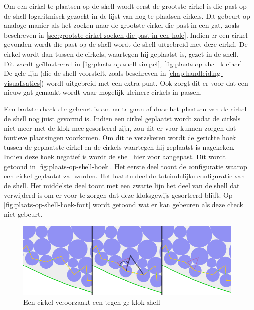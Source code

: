 \documentclass[12pt,a4paper,oneside]{book}
\begin{document}
Om een cirkel te plaatsen op de shell wordt eerst de grootste cirkel is die past op de shell logaritmisch gezocht in de lijst van nog-te-plaatsen cirkels.
Dit gebeurt op analoge manier als het zoeken naar de grootste cirkel die past in een gat, zoals beschreven in \autoref{sec:grootste-cirkel-zoeken-die-past-in-een-hole}.
Indien er een cirkel gevonden wordt die past op de shell wordt de shell uitgebreid met deze cirkel.
De cirkel wordt dan tussen de cirkels, waartegen hij geplaatst is, gezet in de shell.
Dit wordt geïllustreerd in \autoref{fig:plaats-op-shell-simpel}, \autoref{fig:plaats-op-shell-kleiner}.
De gele lijn (die de shell voorstelt, zoals beschreven in \autoref{chap:handleiding-visualisaties}) wordt uitgebreid met een extra punt.
Ook zorgt dit er voor dat een nieuw gat gemaakt wordt waar mogelijk kleinere cirkels in passen.

Een laatste check die gebeurt is om na te gaan of door het plaatsen van de cirkel de shell nog juist gevormd is.
Indien een cirkel geplaatst wordt zodat de cirkels niet meer met de klok mee gesorteerd zijn, zou dit er voor kunnen zorgen dat foutieve plaatsingen voorkomen.
Om dit te verzekeren wordt de gerichte hoek tussen de geplaatste cirkel en de cirkels waartegen hij geplaatst is nagekeken.
Indien deze hoek negatief is wordt de shell hier voor aangepast.
Dit wordt getoond in \autoref{fig:plaats-op-shell-hoek}.
Het eerste deel toont de configuratie waarop een cirkel geplaatst zal worden.
Het laatste deel de toteindelijke configuratie van de shell.
Het middelste deel toont met een zwarte lijn het deel van de shell dat verwijderd is om er voor te zorgen dat deze kloksgewijs gesorteerd blijft.
Op \autoref{fig:plaats-op-shell-hoek-fout}  wordt getoond wat er kan gebeuren als deze check niet gebeurt.

\begin{figure}
  \centering
  \includegraphics[width=1.0\textwidth]{plaats-op-shell-hoek.png}
  \caption{Een cirkel veroorzaakt een tegen-ge-klok shell} \label{fig:plaats-op-shell-hoek} 
\end{figure}
\end{document}

